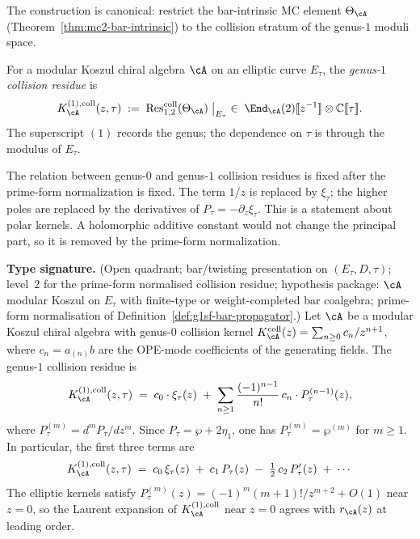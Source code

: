 The construction is canonical: restrict the bar-intrinsic MC element
$\Theta_\cA$ (Theorem~\ref{thm:mc2-bar-intrinsic}) to the collision
stratum of the genus-$1$ moduli space.

\begin{definition}
\label{def:g1sf-collision-residue}
For a modular Koszul chiral algebra $\cA$ on an elliptic curve
$E_\tau$, the \emph{genus-$1$ collision residue} is
\begin{equation}\label{eq:g1sf-collision-residue}
K_\cA^{(1),\mathrm{coll}}(z, \tau)
\;:=\;
\operatorname{Res}^{\mathrm{coll}}_{1,2}(\Theta_\cA)
\bigm|_{E_\tau}
\;\in\;
\End_\cA(2)[\![z^{-1}]\!] \otimes \mathbb{C}[\![\tau]\!].
\end{equation}
The superscript $(1)$ records the genus; the dependence on $\tau$
is through the modulus of $E_\tau$.
\end{definition}

The relation between genus-$0$ and genus-$1$ collision residues is
fixed after the prime-form normalization is fixed. The term $1/z$ is
replaced by $\xi_\tau$; the higher poles are replaced by the
derivatives of $P_\tau=-\partial_z\xi_\tau$. This is a statement about
polar kernels. A holomorphic additive constant would not change the
principal part, so it is removed by the prime-form normalization.

\begin{theorem}
\label{thm:g1sf-elliptic-regularization}
\textbf{Type signature.} (Open quadrant; bar/twisting presentation on
$(E_\tau, D, \tau)$; level~$2$ for the prime-form normalised collision
residue; hypothesis package: $\cA$ modular Koszul on $E_\tau$ with
finite-type or weight-completed bar coalgebra; prime-form
normalisation of Definition~\ref{def:g1sf-bar-propagator}.)
Let $\cA$ be a modular Koszul chiral algebra with genus-$0$ collision
kernel $K_\cA^{\mathrm{coll}}(z)=\sum_{n\geq0}c_n/z^{n+1}$, where
$c_n = a_{(n)}b$ are the OPE-mode coefficients of the generating
fields. The genus-$1$ collision residue is
\begin{equation}\label{eq:g1sf-elliptic-expansion}
K_\cA^{(1),\mathrm{coll}}(z, \tau)
\;=\;
c_0 \cdot \xi_\tau(z)
\;+\;
\sum_{n \geq 1}
 \frac{(-1)^{n-1}}{n!}\,
 c_n \cdot P_\tau^{(n-1)}(z),
\end{equation}
where $P_\tau^{(m)} = d^mP_\tau/dz^m$. Since
$P_\tau=\wp+2\eta_1$, one has $P_\tau^{(m)}=\wp^{(m)}$ for
$m\geq1$. In particular, the first three terms are
\begin{equation}\label{eq:g1sf-first-three-terms}
K_\cA^{(1),\mathrm{coll}}(z, \tau)
\;=\;
c_0\, \xi_\tau(z)
\;+\;
c_1\, P_\tau(z)
\;-\;
\tfrac{1}{2}\, c_2\, P_\tau'(z)
\;+\; \cdots
\end{equation}
The elliptic kernels satisfy
$P_\tau^{(m)}(z) = (-1)^m (m+1)!/z^{m+2} + O(1)$ near $z = 0$, so the
Laurent expansion of $K_\cA^{(1),\mathrm{coll}}$ near $z = 0$ agrees with
$r_\cA(z)$ at leading order.
\end{theorem}

